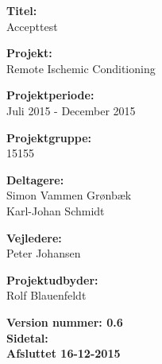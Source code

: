 \begin{minipage}[t]{0.48\textwidth}
\textbf{Titel:} \\[5pt]\bigskip\hspace{2ex}
Accepttest

\textbf{Projekt:} \\[5pt]\bigskip\hspace{2ex}
Remote Ischemic Conditioning

\textbf{Projektperiode:} \\[5pt]\bigskip\hspace{2ex}
Juli 2015 - December 2015

\textbf{Projektgruppe:} \\[5pt]\bigskip\hspace{2ex}
15155

\textbf{Deltagere:} \\[5pt]\hspace*{2ex}
Simon Vammen Grønbæk\\\hspace*{2ex}
Karl-Johan Schmidt \\\hspace*{2ex}


\textbf{Vejledere:} \\[5pt]\hspace*{2ex}
Peter Johansen \\\bigskip\hspace{2ex}

\textbf{Projektudbyder:} \\[5pt]\hspace*{2ex}
Rolf Blauenfeldt\\\bigskip\hspace{2ex}
\vspace*{4cm}

\textbf{Version nummer: 0.6} \\
\textbf{Sidetal: \pageref{LastPage}} \\
\textbf{Afsluttet 16-12-2015}

\end{minipage}
\hfill
